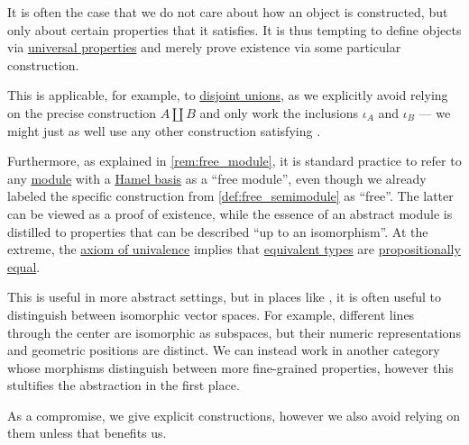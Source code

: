 \begin{remark}\label{rem:universal_property_as_definition}
  It is often the case that we do not care about how an object is constructed, but only about certain properties that it satisfies. It is thus tempting to define objects via \hyperref[con:universal_property]{universal properties} and merely prove existence via some particular construction.

  This is applicable, for example, to \hyperref[def:disjoint_union]{disjoint unions}, as we explicitly avoid relying on the precise construction \( A \amalg B \) and only work the inclusions \( \iota_A \) and \( \iota_B \) --- we might just as well use any other construction satisfying .

  Furthermore, as explained in \cref{rem:free_module}, it is standard practice to refer to any \hyperref[def:module]{module} with a \hyperref[def:hamel_basis]{Hamel basis} as a \enquote{free module}, even though we already labeled the specific construction from \cref{def:free_semimodule} as \enquote{free}. The latter can be viewed as a proof of existence, while the essence of an abstract module is distilled to properties that can be described \enquote{up to an isomorphism}. At the extreme, the \hyperref[def:univalence_axiom]{axiom of univalence} implies that \hyperref[def:equivalence_of_types]{equivalent types} are \hyperref[def:mltt_propositional_equality]{propositionally equal}.

  This is useful in more abstract settings, but in places like , it is often useful to distinguish between isomorphic vector spaces. For example, different lines through the center are isomorphic as subspaces, but their numeric representations and geometric positions are distinct. We can instead work in another category whose morphisms distinguish between more fine-grained properties, however this stultifies the abstraction in the first place.

  As a compromise, we give explicit constructions, however we also avoid relying on them unless that benefits us.
\end{remark}
